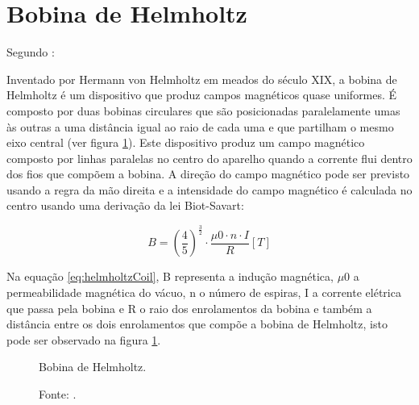 \section{Bobina de Helmholtz}
Segundo \cite[p. 11, 12, tradução nossa]{caldeira2017}:

\begin{quoting}[rightmargin=0cm,leftmargin=4cm]
{\footnotesize 
Inventado por Hermann von Helmholtz em meados do século XIX, a bobina de Helmholtz é um dispositivo que produz campos magnéticos quase uniformes. É composto por duas bobinas circulares que são posicionadas paralelamente umas às outras a uma distância igual ao raio de cada uma e que partilham o mesmo eixo central (ver figura \ref{fig:bh}). Este dispositivo produz um campo magnético composto por linhas paralelas no centro do aparelho quando a corrente flui dentro dos fios que compõem a bobina. A direção do campo magnético pode ser previsto usando a regra da mão direita e a intensidade do campo magnético é calculada no centro usando uma derivação da lei Biot-Savart:

\begin{equation}
    B = 	\left ( \frac{4}{5} \right )^{\frac{3}{2}}\cdot \frac{\mu 0 \cdot n \cdot I}{R} [T]
    \label{eq:helmholtzCoil}
\end{equation}


}
\end{quoting}

Na equação \ref{eq:helmholtzCoil}, B representa a indução magnética, $\mu$0 a permeabilidade magnética do vácuo, n o número de espiras, I a corrente elétrica que passa pela bobina e R o raio dos enrolamentos da bobina e também a distância entre os dois enrolamentos que compõe a bobina de Helmholtz, isto pode ser observado na figura \ref{fig:bh}.

\begin{figure}[H]
    \centering
     \caption{Bobina de Helmholtz.}
     \label{fig:bh}
     \caption*{Fonte: \cite{caldeira2017}.}
\end{figure}

